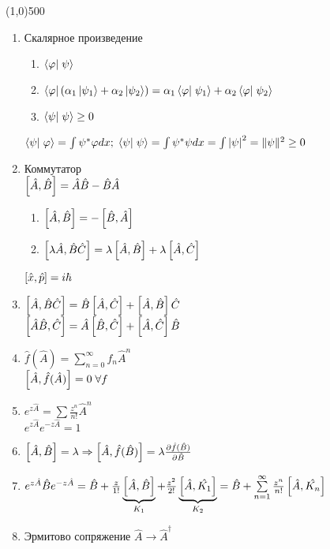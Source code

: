 


\fontsize{20}{24}
\line(1,0){500}
\fontsize{12}{15}
\begin{enumerate}
\item Скалярное произведение
	\begin{enumerate}
	      \item $\braket{\varphi}{\psi}$
            \item $\bra{\varphi}(\alpha_1\ket{\psi_1}+\alpha_2\ket{\psi_2})=\alpha_1\braket{\varphi}{\psi_1}+\alpha_2\braket{\varphi}{\psi_2}$
            \item $\braket{\psi}{\psi}\geq 0$
	\end{enumerate}
      $\braket{\psi}{\varphi}=\int\psi^*\varphi dx;\;\braket{\psi}{\psi}=\int\psi^*\psi dx =\int\abs{\psi}^2=\qnorm{\psi}\geq 0$
\item Коммутатор\\
      $\left[ \hat{A}, \hat{B} \right]=\hat{A}\hat{B}-\hat{B}\hat{A}$
      \begin{enumerate}
            \item $ \left[ \hat{A}, \hat{B} \right]=-\left[ \hat{B}, \hat{A} \right] $
            \item $ \left[ \lambda\hat{A},\hat{B}\hat{C} \right] = \lambda\left[ \hat{A}, \hat{B} \right] + \lambda\left[ \hat{A}, \hat{C} \right] $
      \end{enumerate}
      $\left[ \hat{x}, \hat{p} \right]=i\hbar$
\item $ \left[ \hat{A}, \hat{B}\hat{C} \right] = \hat{B}\left[ \hat{A}, \hat{C} \right] + \left[ \hat{A}, \hat{B} \right]\hat{C} $\\
      $ \left[ \hat{A}\hat{B}, \hat{C} \right] = \hat{A}\left[ \hat{B}, \hat{C} \right] + \left[ \hat{A}, \hat{C} \right]\hat{B} $
\item $ \hat{f}(\hat{A})=\sum\limits_{n=0}^{\infty}f_n \hat{A}^n $\\
      $\left[ \hat{A}, \hat{f}(\hat{A}) \right] = 0\;\forall f $
\item $ e^{z\hat{A}}=\sum \frac{z^n}{n!}\hat{A}^n $ \\
      $ e^{z\hat{A}}e^{-z\hat{A}} = 1 $
\item $ \left[ \hat{A}, \hat{B} \right]=\lambda \Rightarrow \left[ \hat{A}, \hat{f}(\hat{B}) \right]=\lambda \frac{\partial \hat{f}(\hat{B})}{\partial \hat{B}} $
\item $ e^{z\hat{A}}\hat{B}e^{-z\hat{A}} = \hat{B} + \frac{z}{1!}\underbrace{\left[ \hat{A}, \hat{B} \right]}_{K_1} + \frac{z^2}{2!}\underbrace{\left[ \hat{A}, \hat{K_1} \right]}_{K_2} = \hat{B}+\sum\limits_{n=1}^{\infty}\frac{z^n}{n!}\left[ \hat{A}, \hat{K_n} \right] $
\item Эрмитово сопряжение $\hat{A}\rightarrow\hat{A}^\dagger $\\

\end{enumerate}
